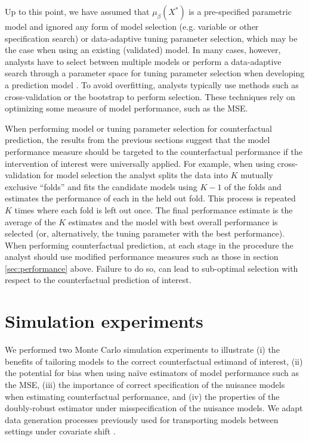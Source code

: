 Up to this point, we have assumed that $\mu_{\beta}(X^*)$ is a pre-specified parametric model and ignored any form of model selection (e.g. variable or other specification search) or data-adaptive tuning parameter selection, which may be the case when using an existing (validated) model. In many cases, however, analysts have to select between multiple models or perform a data-adaptive search through a parameter space for tuning parameter selection when developing a prediction model \cite{steyerberg_clinical_2019}. To avoid overfitting, analysts typically use methods such as cross-validation or the bootstrap to perform selection. These techniques rely on optimizing some measure of model performance, such as the MSE.

When performing model or tuning parameter selection for counterfactual prediction, the results from the previous sections suggest that the model performance measure should be targeted to the counterfactual performance if the intervention of interest were universally applied. For example, when using cross-validation for model selection the analyst splits the data into $K$ mutually exclusive ``folds'' and fits the candidate models using $K - 1$ of the folds and estimates the performance of each in the held out fold. This process is repeated $K$ times where each fold is left out once. The final performance estimate is the average of the $K$ estimates and the model with best overall performance is selected (or, alternatively, the tuning parameter with the best performance). When performing counterfactual prediction, at each stage in the procedure the analyst should use modified performance measures such as those in section \ref{sec:performance} above. Failure to do so, can lead to sub-optimal selection with respect to the counterfactual prediction of interest. 


\section{Simulation experiments} \label{sec:simulation}
We performed two Monte Carlo simulation experiments to illustrate (i) the benefits of tailoring models to the correct counterfactual estimand of interest, (ii) the potential for bias when using na\"{i}ve estimators of model performance such as the MSE, (iii) the importance of correct specification of the nuisance models when estimating counterfactual performance, and (iv) the properties of the doubly-robust estimator under misspecification of the nuisance models. We adapt data generation processes previously used for transporting models between settings under covariate shift \cite{steingrimsson_transporting_2023, morrison_robust_2022}.

